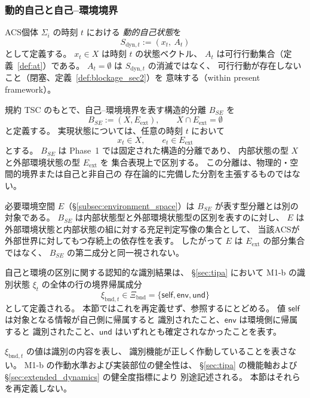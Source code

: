 \subsubsection{動的自己と自己--環境境界}

\begin{definition}[動的自己状態]
\label{def:s_dyn}
ACS個体 $\Sigma_i$ の時刻 $t$ における
\emph{動的自己状態}を
\[
  S_{\mathrm{dyn},t} := (x_t,\ A_t)
\]
として定義する。
$x_t\in X$ は時刻 $t$ の状態ベクトル、
$A_t$ は可行行動集合（定義~\ref{def:at}）である。
$A_t = \emptyset$ は $S_{\mathrm{dyn},t}$ の消滅ではなく、
可行行動が存在しないこと（閉塞、定義~\ref{def:blockage_sec2}）を
意味する（within present framework）。
\end{definition}

\begin{definition}[自己--環境境界]
\label{def:b_se}
規約 TSC のもとで、自己--環境境界を表す構造的分離
$B_{SE}$ を
\[
  B_{SE}:=(X,E_{\mathrm{ext}}),
  \qquad
  X\cap E_{\mathrm{ext}}=\emptyset
\]
と定義する。
実現状態については、任意の時刻 $t$ において
\[
  x_t\in X,
  \qquad
  e_t\in E_{\mathrm{ext}}
\]
とする。
$B_{SE}$ は Phase~1 では固定された構造的分離であり、
内部状態の型 $X$ と外部環境状態の型 $E_{\mathrm{ext}}$ を
集合表現上で区別する。
この分離は、物理的・空間的境界または自己と非自己の
存在論的に完備した分割を主張するものではない。

必要環境空間 $E$（\S\ref{subsec:environment_space}）は
$B_{SE}$ が表す型分離とは別の対象である。
$B_{SE}$ は内部状態型と外部環境状態型の区別を表すのに対し、
$E$ は外部環境状態と内部状態の組に対する充足判定写像の集合として、
当該ACSが外部世界に対してもつ存続上の依存性を表す。
したがって $E$ は $E_{\mathrm{ext}}$ の部分集合ではなく、
$B_{SE}$ の第二成分と同一視されない。
\end{definition}

\begin{remark}
\label{rem:xi_bnd_reference}
自己と環境の区別に関する認知的な識別結果は、
\S\ref{sec:tipa} において M1-b の識別状態
$\xi_t$ の全体の行の境界帰属成分
\[
  \xi_{\mathrm{bnd},t}
  \in
  \Xi_{\mathrm{bnd}}
  =
  \{\mathsf{self},\mathsf{env},\mathsf{und}\}
\]
として定義される。
本節ではこれを再定義せず、参照するにとどめる。
値 $\mathsf{self}$ は対象となる情報が自己側に帰属すると
識別されたこと、$\mathsf{env}$ は環境側に帰属すると
識別されたこと、$\mathsf{und}$ はいずれとも確定されなかったことを表す。

$\xi_{\mathrm{bnd},t}$ の値は識別の内容を表し、
識別機能が正しく作動していることを表さない。
M1-b の作動水準および実装部位の健全性は、
\S\ref{sec:tipa} の機能軸および
\S\ref{sec:extended_dynamics} の健全度指標により
別途記述される。
本節はそれらを再定義しない。
\end{remark}

